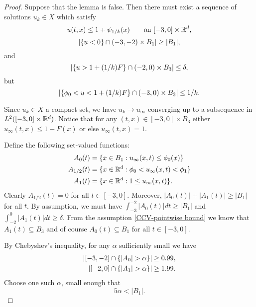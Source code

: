 \begin{proof}
Suppose that the lemma is false.  Then there must exist a sequence of solutions $u_k \in X$ which satisfy
\begin{equation} \label{CCV-pointwise bound k}
u(t,x) \leq 1 + \psi_{1/k}(x) \qquad \textrm{on } [-3,0]\times\mathbb{R}^d, 
\end{equation}
\[ \left\lvert \{u < 0\} \cap (-3,-2)\times B_1 \right\rvert \geq |B_1|, \]
and
\[ \left\lvert \{u > 1 + (1/k)F\} \cap (-2,0)\times B_3 \right\rvert \leq \delta, \]
but
\[ \left\lvert \{\phi_0 < u < 1 + (1/k)F\} \cap (-3,0)\times B_3 \right\rvert \leq 1/k. \]

Since $u_k \in X$ a compact set, we have $u_k \to u_\infty$ converging up to a subsequence in $L^2([-3,0]\times\mathbb{R}^d)$.  Notice that for any $(t,x) \in [-3,0]\times B_3$ either $u_\infty(t,x) \leq 1-F(x)$ or else $u_\infty(t,x) = 1$.  


Define the following set-valued functions:
\begin{align*}
A_0(t) &= \{x\in B_1: u_\infty(x,t) \leq \phi_0(x)\} \\
A_{1/2}(t) &= \{x\in \mathbb{R}^d: \phi_0 < u_\infty(x,t) < \phi_1 \} \\
A_1(t) &= \{x\in \mathbb{R}^d: 1 \leq u_\infty(x,t)\}.
\end{align*}
Clearly $A_{1/2}(t) = 0$ for all $t \in [-3,0]$.  Moreover, $|A_0(t)| + |A_1(t)| \geq |B_1|$ for all $t$.  By assumption, we must have $\int_{-3}^{-2} |A_0(t)|dt \geq |B_1|$ and $\int_{-2}^0 |A_1(t)|dt \geq \delta$.  From the assumption \eqref{CCV-pointwise bound} we know that $A_1(t) \subseteq B_3$ and of course $A_0(t) \subseteq B_1$ for all $t \in [-3,0]$.  

By Chebyshev's inequality, for any $\alpha$ sufficiently small we have
\begin{equation} \label{CCV-big 99percent of the time k}\begin{aligned}
\left\lvert [-3,-2] \cap \{|A_0| > \alpha\} \right\rvert &\geq 0.99, \\
|[-2,0] \cap \{|A_1| > \alpha\}| &\geq 1.99.
\end{aligned} \end{equation}
Choose one such $\alpha$, small enough that
\begin{equation} \label{CCV-asssumption on gamma_0 k}
5 \alpha< |B_1|.  
\end{equation}


\end{proof}
